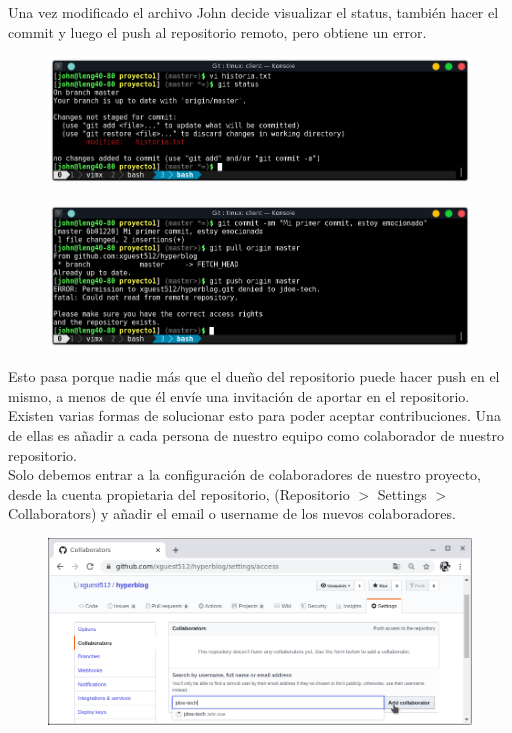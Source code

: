 \documentclass{article}
\begin{document}
Una vez modificado el archivo John decide visualizar el status, también hacer
el commit y luego el push al repositorio remoto, pero obtiene un error.

\newpage

\begin{figure}[h!]
  \centering
  \includegraphics[scale=0.75]{./Pictures/263_historia_mod.png}
\end{figure}

\begin{figure}[h!]
  \centering
  \includegraphics[scale=0.75]{./Pictures/264_push_error.png}
\end{figure}

Esto pasa porque nadie más que el dueño del repositorio puede hacer push en el
mismo, a menos de que él envíe una invitación de aportar en el repositorio.
Existen varias formas de solucionar esto para poder aceptar contribuciones. Una
de ellas es añadir a cada persona de nuestro equipo como colaborador de nuestro
repositorio.\\

Solo debemos entrar a la configuración de colaboradores de nuestro proyecto,
desde la cuenta propietaria del repositorio, (Repositorio $>$ Settings $>$
Collaborators) y añadir el email o username de los nuevos colaboradores.\\

\begin{figure}[h!]
  \centering
  \includegraphics[scale=0.75]{./Pictures/265_add_collaborator.png}
\end{figure}
\end{document}
